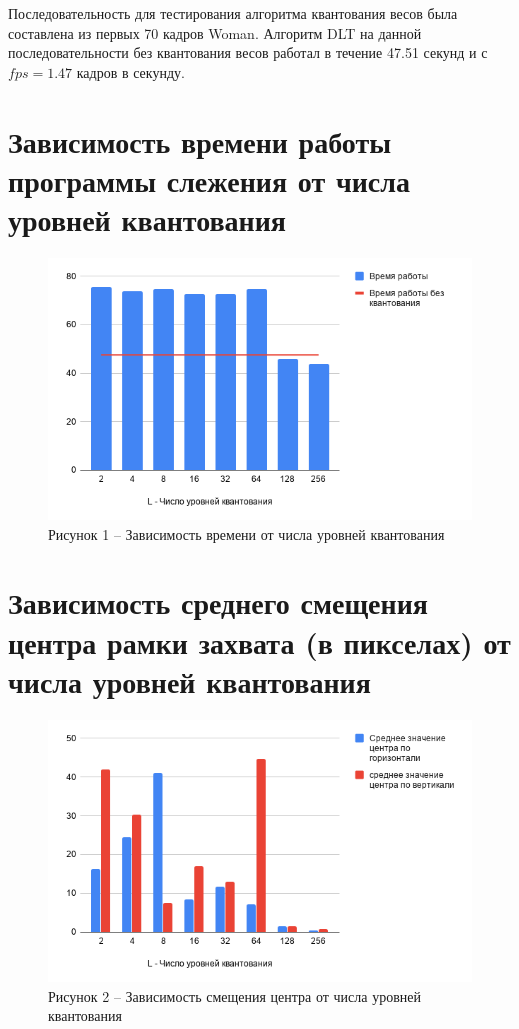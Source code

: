 \documentclass[14pt, a4paper]{article}
\begin{document}
Последовательность для тестирования алгоритма квантования весов была составлена из первых 70 кадров Woman. Алгоритм DLT на данной последовательности без квантования весов работал в течение 47.51 секунд и с $fps = 1.47$ кадров в секунду.

\section*{Зависимость времени работы программы слежения от числа уровней квантования}



\begin{figure}[h!]
    \centering
    \includegraphics[width = 14cm]{tests/img/time.png}
    \caption*{Рисунок 1 -- Зависимость времени от числа уровней квантования}
\end{figure}

\section*{Зависимость среднего смещения центра рамки захвата (в пикселах) от числа уровней квантования}



\begin{figure}[h!]
    \centering
    \includegraphics[width = 14 cm]{tests/img/sm.png}
    \caption*{Рисунок 2 -- Зависимость смещения центра от числа уровней квантования}
\end{figure}
\end{document}
